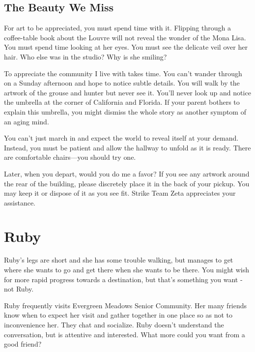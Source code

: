 \documentclass[
  letterpaper,
  DIV=11,
  numbers=noendperiod]{scrreprt}
\begin{document}
\section*{The Beauty We Miss}\label{the-beauty-we-miss}


For art to be appreciated, you must spend time with it. Flipping through
a coffee-table book about the Louvre will not reveal the wonder of the
Mona Lisa. You must spend time looking at her eyes. You must see the
delicate veil over her hair. Who else was in the studio? Why is she
smiling?

To appreciate the community I live with takes time. You can't wander
through on a Sunday afternoon and hope to notice subtle details. You
will walk by the artwork of the grouse and hunter but never see it.
You'll never look up and notice the umbrella at the corner of California
and Florida. If your parent bothers to explain this umbrella, you might
dismiss the whole story as another symptom of an aging mind.

You can't just march in and expect the world to reveal itself at your
demand. Instead, you must be patient and allow the hallway to unfold as
it is ready. There are comfortable chairs---you should try one.

Later, when you depart, would you do me a favor? If you see any artwork
around the rear of the building, please discretely place it in the back
of your pickup. You may keep it or dispose of it as you see fit. Strike
Team Zeta appreciates your assistance.


\chapter*{Ruby}\label{ruby}


Ruby's legs are short and she has some trouble walking, but manages to
get where she wants to go and get there when she wants to be there. You
might wish for more rapid progress towards a destination, but that's
something you want - not Ruby.

Ruby frequently visits Evergreen Meadows Senior Community. Her many
friends know when to expect her visit and gather together in one place
so as not to inconvenience her. They chat and socialize. Ruby doesn't
understand the conversation, but is attentive and interested. What more
could you want from a good friend?
\end{document}
